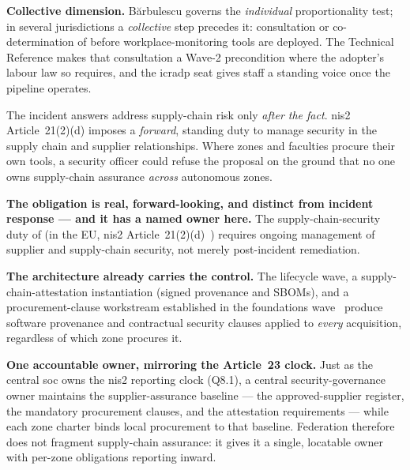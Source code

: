 \begin{answerbox}[Answer to Q8.4]
\medskip
\noindent\textbf{Collective dimension.} B\u{a}rbulescu governs the
\emph{individual} proportionality test; in several jurisdictions a
\emph{collective} step precedes it: consultation or co-determination
of  before workplace-monitoring tools
are deployed. The Technical Reference makes that consultation a
Wave-2 precondition where the adopter's labour law so requires, and
the \gls{icradp} seat gives staff a standing voice once the
pipeline operates.
\end{answerbox}

\bigskip

\begin{questionbox}
The incident answers address supply-chain risk only \emph{after the fact}. \gls{nis2} Article~21(2)(d) imposes a \emph{forward}, standing duty to manage security in the supply chain and supplier relationships. Where zones and faculties procure their own tools, a security officer could refuse the proposal on the ground that no one owns supply-chain assurance \emph{across} autonomous zones.
\end{questionbox}

\begin{answerbox}[Answer to Q8.5]
\textbf{The obligation is real, forward-looking, and distinct from incident response --- and it has a named owner here.} The supply-chain-security duty of  (in the EU, \gls{nis2} Article~21(2)(d)~\cite{nis2}) requires ongoing management of supplier and supply-chain security, not merely post-incident remediation.

\medskip\noindent\textbf{The architecture already carries the control.} The lifecycle wave, a supply-chain-attestation instantiation (signed provenance and SBOMs), and a procurement-clause workstream established in the foundations wave~\cite{ng-tech-ref-2026} produce software provenance and contractual security clauses applied to \emph{every} acquisition, regardless of which zone procures it.

\medskip\noindent\textbf{One accountable owner, mirroring the Article~23 clock.} Just as the central \gls{soc} owns the \gls{nis2} reporting clock (Q8.1), a central security-governance owner maintains the supplier-assurance baseline --- the approved-supplier register, the mandatory procurement clauses, and the attestation requirements --- while each zone charter binds local procurement to that baseline. Federation therefore does not fragment supply-chain assurance: it gives it a single, locatable owner with per-zone obligations reporting inward.
\end{answerbox}

